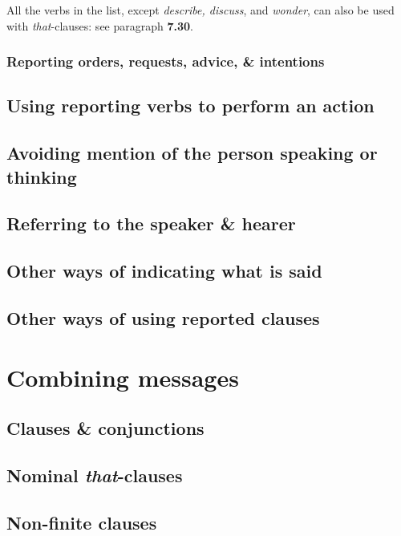 \documentclass[oneside]{book}
\numberwithin{equation}{section}
\begin{document}
%
All the verbs in the list, except \textit{describe, discuss}, and \textit{wonder}, can also be used with \textit{that}-clauses: see paragraph \textbf{7.30}.

\subsection{Reporting orders, requests, advice, \& intentions}

\section{Using reporting verbs to perform an action}

\section{Avoiding mention of the person speaking or thinking}

\section{Referring to the speaker \& hearer}

\section{Other ways of indicating what is said}

\section{Other ways of using reported clauses}


\chapter{Combining messages}

\section{Clauses \& conjunctions}

\section{Nominal \textit{that}-clauses}

\section{Non-finite clauses}
\end{document}
